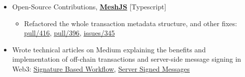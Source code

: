 \documentclass[]{resume-openfont}
\begin{document}
\begin{itemize}
    \item Open-Source Contributions, \href{https://meshjs.dev/}{\textbf{\underline{MeshJS}}} [Typescript]
    \begin{itemize}
        \item Refactored the whole transaction metadata structure, and other fixes: \href{https://github.com/MeshJS/mesh/pull/416}{\underline{pull/416}}, \href{https://github.com/MeshJS/mesh/pull/396}{\underline{pull/396}}, \href{https://github.com/MeshJS/mesh/issues/345}{\underline{issues/345}}
    \end{itemize}

    \item Wrote technical articles on Medium explaining the benefits and implementation of off-chain transactions and server-side message signing in Web3: \href{https://medium.com/coinsbench/off-chain-transactions-on-blockchain-introducing-signature-based-workflow-4bb3b5a7e72f}{\underline{Signature Based Workflow}}, \href{https://medium.com/@dharmveerbharti/server-signed-messages-in-web3-offloading-on-chain-workload-to-off-chain-518bf9bd364b}{\underline{Server Signed Messages}}

    
\end{itemize}
\end{document}
